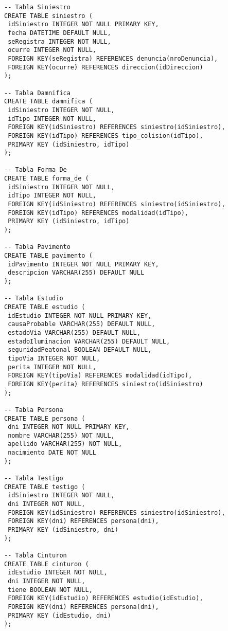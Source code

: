 \begin{verbatim}
-- Tabla Siniestro
CREATE TABLE siniestro (
 idSiniestro INTEGER NOT NULL PRIMARY KEY,
 fecha DATETIME DEFAULT NULL,
 seRegistra INTEGER NOT NULL,
 ocurre INTEGER NOT NULL,
 FOREIGN KEY(seRegistra) REFERENCES denuncia(nroDenuncia),
 FOREIGN KEY(ocurre) REFERENCES direccion(idDireccion)
);

-- Tabla Damnifica
CREATE TABLE damnifica (
 idSiniestro INTEGER NOT NULL,
 idTipo INTEGER NOT NULL,
 FOREIGN KEY(idSiniestro) REFERENCES siniestro(idSiniestro),
 FOREIGN KEY(idTipo) REFERENCES tipo_colision(idTipo),
 PRIMARY KEY (idSiniestro, idTipo)
);

-- Tabla Forma De
CREATE TABLE forma_de (
 idSiniestro INTEGER NOT NULL,
 idTipo INTEGER NOT NULL,
 FOREIGN KEY(idSiniestro) REFERENCES siniestro(idSiniestro),
 FOREIGN KEY(idTipo) REFERENCES modalidad(idTipo),
 PRIMARY KEY (idSiniestro, idTipo)
);

-- Tabla Pavimento
CREATE TABLE pavimento (
 idPavimento INTEGER NOT NULL PRIMARY KEY,
 descripcion VARCHAR(255) DEFAULT NULL
);

-- Tabla Estudio
CREATE TABLE estudio (
 idEstudio INTEGER NOT NULL PRIMARY KEY,
 causaProbable VARCHAR(255) DEFAULT NULL,
 estadoVia VARCHAR(255) DEFAULT NULL,
 estadoIluminacion VARCHAR(255) DEFAULT NULL,
 seguridadPeatonal BOOLEAN DEFAULT NULL,
 tipoVia INTEGER NOT NULL,
 perita INTEGER NOT NULL,
 FOREIGN KEY(tipoVia) REFERENCES modalidad(idTipo),
 FOREIGN KEY(perita) REFERENCES siniestro(idSiniestro) 
);

-- Tabla Persona
CREATE TABLE persona (
 dni INTEGER NOT NULL PRIMARY KEY,
 nombre VARCHAR(255) NOT NULL,
 apellido VARCHAR(255) NOT NULL,
 nacimiento DATE NOT NULL
);

-- Tabla Testigo
CREATE TABLE testigo (
 idSiniestro INTEGER NOT NULL,
 dni INTEGER NOT NULL,
 FOREIGN KEY(idSiniestro) REFERENCES siniestro(idSiniestro),
 FOREIGN KEY(dni) REFERENCES persona(dni),
 PRIMARY KEY (idSiniestro, dni)
);

-- Tabla Cinturon
CREATE TABLE cinturon (
 idEstudio INTEGER NOT NULL,
 dni INTEGER NOT NULL,
 tiene BOOLEAN NOT NULL,
 FOREIGN KEY(idEstudio) REFERENCES estudio(idEstudio),
 FOREIGN KEY(dni) REFERENCES persona(dni),
 PRIMARY KEY (idEstudio, dni)
);


\end{verbatim}